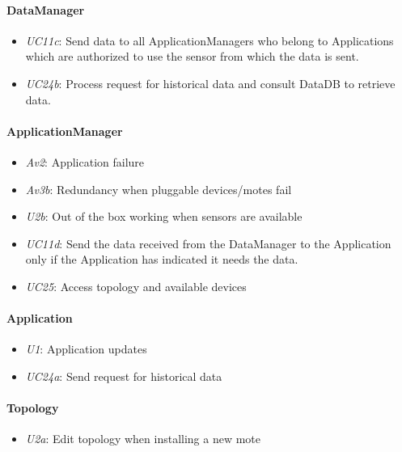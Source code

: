 \documentclass[english]{sareport}
\begin{document}
\paragraph{DataManager}
\begin{itemize}
	\item \emph{UC11c}: Send data to all ApplicationManagers who belong to Applications which are authorized to use the sensor from which the data is sent.
	\item \emph{UC24b}: Process request for historical data and consult DataDB to retrieve data.
\end{itemize}

\paragraph{ApplicationManager}
\begin{itemize}
	\item \emph{Av2}: Application failure
	\item \emph{Av3b}: Redundancy when pluggable devices/motes fail 
	\item \emph{U2b}: Out of the box working when sensors are available
	\item \emph{UC11d}: Send the data received from the DataManager to the Application only if the Application has indicated it needs the data.
	\item \emph{UC25}: Access topology and available devices
\end{itemize}

\paragraph{Application}
\begin{itemize}
	\item \emph{U1}: Application updates
	\item \emph{UC24a}: Send request for historical data
\end{itemize}

\paragraph{Topology}
\begin{itemize}
	\item \emph{U2a}: Edit topology when installing a new mote
\end{itemize}
\end{document}
